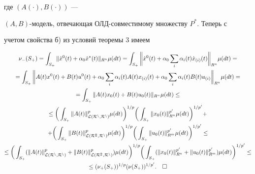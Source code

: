 где $(A(\cdot),B(\cdot))$ --- 


$(A,B)$-модель, отвечающая ОЛД-совместимому множеству $P^*$. Теперь с 


учетом свойства б) из условий теоремы 3 имеем 


\begin{multline*} 


\nu_-(S_+)=\int_{S_+}\|\Dot x^0(t)+\alpha_0\Dot x^*(t)\|_{R^n} 


\mu(dt)=\int_{S_+}\bigg\|\Dot x^0(t)+\alpha_0\sum_i\alpha_i(t) 


\Dot x_{(i)}(t)\bigg\|_{R^n}\mu(dt)= \\ 


% 


=\int_{S_+}\bigg\|A(t)x^0(t)+B(t)u^0(t)+\alpha_0\sum_i 


\alpha_i(t)A(t)x_{(i)}(t)+\alpha_0\sum_i\alpha_i(t)B(t)u_{(i)} 


\bigg\|_{R^n}\mu(dt) = \\ 


% 


=\int_{S_+}\|A(t)x_0(t)+B(t)u_0(t)\|_{R^n}\mu(dt)\le \\ 


% 


\le\bigg(\int_{S_+}\|A(t)\|^p_{\cal L(R^n,R^n)}\mu(dt)\bigg)^{1/p} 


\bigg(\int_{S_+}\|x_0(t)\|^{p'}_{R^n}\mu(dt)\bigg)^{1/p'}+ \\


%


+\bigg(\int_{S_+}\|B(t)\|^p_{\cal L(R^m,R^n)}\mu(dt)\bigg)^{1/p} 


\bigg(\int_{S_+}\|u_0(t)\|^{p'}_{R^m}\mu(dt)\bigg)^{1/p'}\le \\


% 


\le\bigg(\int_{S_+}(\|A(t)\|^p_{\cal L(R^n,R^n)}+ 


\|B(t)\|^p_{\cal L(R^m,R^n)})\mu(dt)\bigg)^{1/p} 


\bigg(\int_{S_+}(\|x_0(t)\|^{p'}_{R^n}+ 


\|u_0(t)\|^{p'}_{R^m})\mu(dt)\bigg)^{1/p'}\le \\


%


\le (\nu_+(S_+))^{1/p}(\nu(S_+))^{1/p'}.\quad\square 


\end{multline*} 


 


